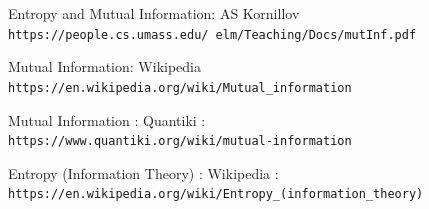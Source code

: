 \documentclass{article}
\begin{document}
\begin{thebibliography}{9}
\label{sec:hello}

Entropy and Mutual Information: \newline
AS Kornillov
\\\texttt{https://people.cs.umass.edu/~elm/Teaching/Docs/mutInf.pdf}

Mutual Information: \newline
Wikipedia 
\\
\texttt{https://en.wikipedia.org/wiki/Mutual_information}

Mutual Information : \newline
Quantiki :
\\
\texttt{https://www.quantiki.org/wiki/mutual-information}

Entropy (Information Theory) : \newline
Wikipedia :
\\
\texttt{https://en.wikipedia.org/wiki/Entropy_(information_theory)}

\end{thebibliography}
\end{document}
